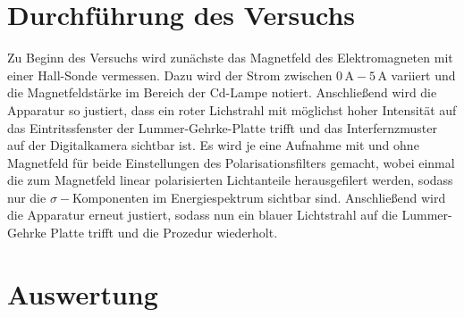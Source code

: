\section{Durchführung des Versuchs}
Zu Beginn des Versuchs wird zunächste das Magnetfeld des Elektromagneten mit einer Hall-Sonde vermessen. Dazu wird der Strom zwischen $0\,\si{\A}-5\,\si{\A}$ variiert und die Magnetfeldstärke im Bereich der
Cd-Lampe notiert.
Anschließend wird die Apparatur so justiert, dass ein roter Lichstrahl mit möglichst hoher Intensität auf das Eintritssfenster der Lummer-Gehrke-Platte trifft und das Interfernzmuster auf der Digitalkamera sichtbar ist.
Es wird je eine Aufnahme mit und ohne Magnetfeld für beide Einstellungen des Polarisationsfilters gemacht, wobei einmal die zum Magnetfeld linear polarisierten Lichtanteile herausgefilert werden, sodass nur die $\sigma-$Komponenten
im Energiespektrum sichtbar sind.
Anschließend wird die Apparatur erneut justiert, sodass nun ein blauer Lichtstrahl auf die Lummer-Gehrke Platte trifft und die Prozedur wiederholt.

\section{Auswertung}

